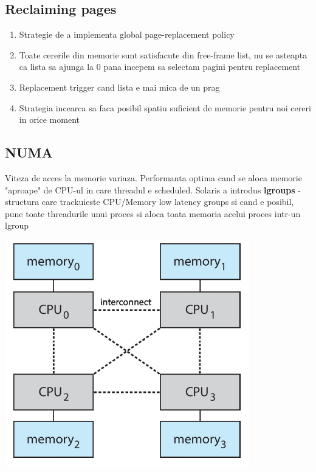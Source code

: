 \documentclass{article}
\begin{document}
\subsection*{Reclaiming pages}
\begin{enumerate}
    \item Strategie de a implementa global page-replacement policy
    \item Toate cererile din memorie sunt satisfacute din free-frame list, nu se asteapta ca lista sa ajunga la 0 pana incepem sa selectam pagini pentru replacement
    \item Replacement trigger cand lista e mai mica de un prag
    \item Strategia incearca sa faca posibil spatiu suficient de memorie pentru noi cereri in orice moment
\end{enumerate}

\subsection*{NUMA}
Viteza de acces la memorie variaza. Performanta optima cand se aloca memorie "aproape" de CPU-ul in care threadul e scheduled. Solaris a introdus \textbf{lgroups} - structura care trackuieste CPU/Memory low latency groups si cand e posibil, pune toate threadurile unui proces si aloca toata memoria acelui proces intr-un lgroup
\begin{center}
    \includegraphics[scale=0.4]{38-numa.png}
\end{center}
\end{document}
